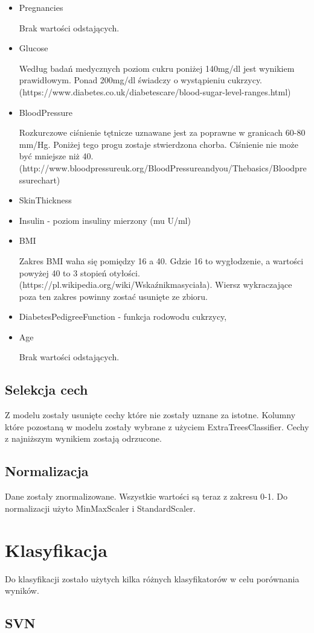 \documentclass[12pt]{article}
\begin{document}
\begin{itemize}
\item Pregnancies

	Brak wartości odstających.
\item Glucose 

	Według badań medycznych poziom cukru poniżej 140mg/dl jest wynikiem prawidłowym. Ponad 200mg/dl świadczy o wystąpieniu cukrzycy. (https://www.diabetes.co.uk/diabetescare/blood-sugar-level-ranges.html)
\item BloodPressure 

	Rozkurczowe ciśnienie tętnicze uznawane jest za poprawne w granicach 60-80 mm/Hg. Poniżej tego progu zostaje stwierdzona chorba. Ciśnienie nie może być mniejsze niż 40. (http://www.bloodpressureuk.org/BloodPressureandyou/Thebasics/Bloodpressurechart)
\item SkinThickness


\item Insulin - poziom insuliny mierzony (mu U/ml)
\item BMI 

	Zakres BMI waha się pomiędzy 16 a 40. Gdzie 16 to wygłodzenie, a wartości powyżej 40 to 3 stopień otyłości. (https://pl.wikipedia.org/wiki/Wskaźnikmasyciała). Wiersz wykraczające poza ten zakres powinny zostać usunięte ze zbioru.
	
\item DiabetesPedigreeFunction - funkcja rodowodu cukrzycy,
\item Age
	
	Brak wartości odstających.

\end{itemize}
\subsection{Selekcja cech}
	Z modelu zostały usunięte cechy które nie zostały uznane za istotne. Kolumny które pozostaną w modelu zostały wybrane z użyciem ExtraTreesClassifier. Cechy z najniższym wynikiem zostają odrzucone.  
\subsection{Normalizacja}
	Dane zostały znormalizowane. Wszystkie wartości są teraz z zakresu 0-1. Do normalizacji użyto MinMaxScaler i StandardScaler.
\section{Klasyfikacja}
	Do klasyfikacji zostało użytych kilka różnych klasyfikatorów w celu porównania wyników.

\subsection{SVN}
\subsection{}
\end{document}
